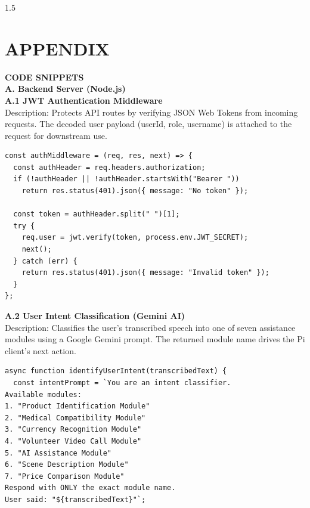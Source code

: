 \newpage
\begin{spacing}{1.5}
%
\chapter*{APPENDIX}
%

\thispagestyle{empty}
\noindent \textbf{CODE SNIPPETS}\\


\noindent \textbf{A. Backend Server (Node.js)}\\

\noindent \textbf{A.1 JWT Authentication Middleware}\\
Description: Protects API routes by verifying JSON Web Tokens from incoming requests. The decoded user payload (userId, role, username) is attached to the request for downstream use.
\begin{verbatim}
const authMiddleware = (req, res, next) => {
  const authHeader = req.headers.authorization;
  if (!authHeader || !authHeader.startsWith("Bearer "))
    return res.status(401).json({ message: "No token" });

  const token = authHeader.split(" ")[1];
  try {
    req.user = jwt.verify(token, process.env.JWT_SECRET);
    next();
  } catch (err) {
    return res.status(401).json({ message: "Invalid token" });
  }
};
\end{verbatim}

\noindent \textbf{A.2 User Intent Classification (Gemini AI)}\\
Description: Classifies the user's transcribed speech into one of seven assistance modules using a Google Gemini prompt. The returned module name drives the Pi client's next action.
\begin{verbatim}
async function identifyUserIntent(transcribedText) {
  const intentPrompt = `You are an intent classifier.
Available modules:
1. "Product Identification Module"
2. "Medical Compatibility Module"
3. "Currency Recognition Module"
4. "Volunteer Video Call Module"
5. "AI Assistance Module"
6. "Scene Description Module"
7. "Price Comparison Module"
Respond with ONLY the exact module name.
User said: "${transcribedText}"`;


\end{verbatim}
\end{spacing}
